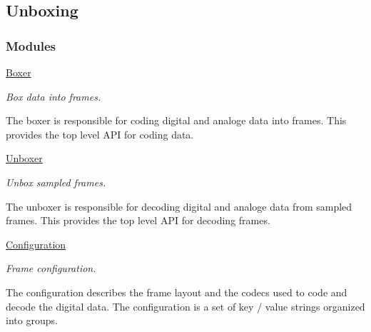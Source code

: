 \hypertarget{group__unbox}{
\subsection{Unboxing}
\label{group__unbox}
}
\subsubsection*{Modules}
\begin{DoxyCompactItemize}
\item 
\hyperlink{group__boxer}{Boxer}


\begin{DoxyCompactList}\small\item\em Box data into frames.

The boxer is responsible for coding digital and analoge data into frames. This provides the top level API for coding data. \item\end{DoxyCompactList}\item 
\hyperlink{group__unboxer}{Unboxer}


\begin{DoxyCompactList}\small\item\em Unbox sampled frames.

The unboxer is responsible for decoding digital and analoge data from sampled frames. This provides the top level API for decoding frames. \item\end{DoxyCompactList}\item 
\hyperlink{group__config}{Configuration}


\begin{DoxyCompactList}\small\item\em Frame configuration.

The configuration describes the frame layout and the codecs used to code and decode the digital data. The configuration is a set of key / value strings organized into groups. \item\end{DoxyCompactList}\end{DoxyCompactItemize}
